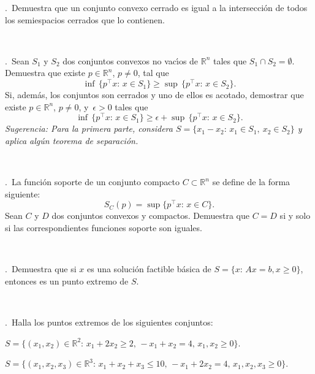 \documentclass[12pt,a4paper,twoside]{article}
\newcounter{problem} \setcounter{problem}{1}
\newcommand{\ex}{\noindent {\sf \bf \theproblem}\addtocounter{problem}{1}.\ }
\begin{document}
\ex Demuestra que un conjunto convexo cerrado es igual a la intersección de todos los semiespacios cerrados que lo contienen.



\





\ex Sean $S_1$ y $S_2$ dos conjuntos convexos no vac{\'\i}os de
$\mathbb{R}^n$ tales que $S_1\cap S_2=\emptyset$. Demuestra que existe
$p\in\mathbb{R}^n$, $p\neq 0$, tal que
\[
\inf\,\{p^\top x:\, x\in S_1\}\geq \sup\,\{p^\top x:\, x\in S_2\}.
\]
 Si,
adem{\'a}s, los conjuntos son cerrados y uno de ellos es acotado,
demostrar que existe $p\in\mathbb{R}^n$, $p\neq 0$, y $\,\epsilon>0$
tales que
\[
\inf\,\{p^\top x:\, x\in S_1\}\geq \epsilon+\sup\,\{p^\top x:\, x\in S_2\}.
\]
 {\em  Sugerencia: Para la primera parte, considera $S=\{x_1-x_2:\, x_1\in
S_1,\ x_2\in S_2\}$ y aplica alg{\'u}n teorema de separaci{\'o}n.}

\

\ex La función soporte de un conjunto compacto $C\subset\mathbb{R}^n$ se define de la forma siguiente:
\[
S_C(p) = \sup\{p^\top x:\, x\in C\}.
\]
Sean $C$ y $D$ dos conjuntos convexos y compactos. Demuestra que $C=D$ si y solo si las correspondientes funciones soporte son iguales.



\

\ex Demuestra que si $x$ es una solución factible básica de $S=\{x:\, Ax=b, x\geq 0\}$, entonces es un punto extremo de $S$.



\

\ex Halla los puntos extremos de los siguientes conjuntos:
\begin{compactitem}
\item[(a)] $S=\{(x_1,x_2)\in \mathbb{R}^2 :\, x_1+2x_2\geq 2,\,
-x_1+x_2=4,\, x_1,x_2\geq 0\}$.
\item[(b)] $S=\{(x_1,x_2,x_3)\in \mathbb{R}^3 :\, x_1+x_2+x_3\leq
10,\, -x_1+2x_2=4,\, x_1,x_2,x_3\geq 0\}$.

\end{compactitem}


\end{document}
